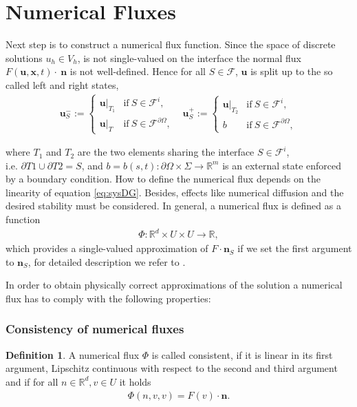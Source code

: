 \documentclass[a4paper,12pt]{article}
\theoremstyle{definition}
\newtheorem{Def}{Definition}
\theoremstyle{definition}
\begin{document}
\section{Numerical Fluxes}


Next step is to construct a numerical flux function. Since the space of discrete solutions $u_h\in V_h$, is not single-valued on the interface the normal flux $ F(\mathbf{u}, \mathbf{x}, t)\cdot~\mathbf{n} $ is not well-defined.
Hence for all $S \in \mathcal{F}$, $\mathbf{u}$ is split up to the so called left and right states, 
\begin{equation}\label{eq:statesplitting}
\begin{matrix}
\mathbf{u}_S^- := \left\lbrace
\begin{array}{ll}
\mathbf{u}\vert_{T_1} & \mathrm{if}\ S \in \mathcal{F}^i, \\
\mathbf{u}\vert_T & \mathrm{if}\ S \in \mathcal{F}^{\partial \Omega},
\end{array} \right.
 & \mathbf{u}_S^+ := \left\lbrace
\begin{array}{ll}
\mathbf{u}\vert_{T_2} & \mathrm{if}\ S \in \mathcal{F}^i, \\
b & \mathrm{if}\ S \in \mathcal{F}^{\partial \Omega},
\end{array}\right.
\end{matrix}
 \end{equation}

where $T_1$ and $T_2$ are the two elements sharing the interface $S \in \mathcal{F}^i$,\\ i.e. \mbox{$\partial T1 \cup \partial T2 = S$},  and \mbox{$b=b(s,t):\partial\Omega\times\Sigma\rightarrow \mathbb{R}^m $} is an external state enforced by a boundary condition.
How to define the numerical flux depends on the linearity of equation \eqref{eq:sysDG}. Besides, effects like numerical diffusion and the desired stability must be considered.
In general, a numerical flux is defined as a function
\begin{align}
\Phi :  \mathbb{R}^d \times U \times U \rightarrow \mathbb{R},
\end{align}
which provides a single-valued approximation of $F \cdot \mathbf{n}_S$ if we set the first argument to $\mathbf{n}_S$, for detailed description we refer to \cite{DiPietro}.

In order to obtain physically correct approximations of the solution a numerical flux has to comply with the following properties:

\subsubsection{Consistency of numerical fluxes}
\begin{Def}\label{def:flux:consistency}
A numerical flux $\Phi$ is called consistent, if it is linear in its first argument, Lipschitz continuous with respect to the second and third argument and if for all $n\in \mathbb{R}^d, v\in U$ it holds
\begin{align}
\Phi(n,v,v) = F(v)\cdot \mathbf{n}.
\end{align}
\end{Def}
\end{document}
